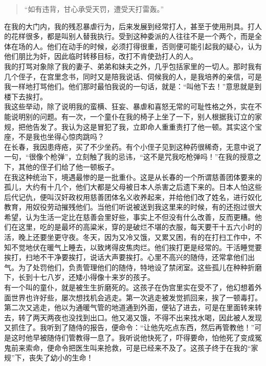\begin{quote}
	“如有违背，甘心承受天罚，遭受天打雷轰。”\\
\end{quote}

在我的大门内，我的残忍暴虐行为，后来发展到经常打人，甚至于使用刑具。打人的花样很多，都是叫别人替我执行。受到这种委派的人往往不是一个两个，而是全体在场的人。他们在动手的时候，必须打得很重，否则便可能引起我的疑心，认为他们朋比为奸，因此临时转移目标，改打不肯使劲打人的人。\\

我的打骂对象除了我的妻子、弟弟和妹夫之外，几乎包括家里的一切人。那时我有几个侄子，在宫里念书，同时又是陪我说话、伺候我的人，是我培养的亲信，可是我一样地打骂他们。他们那时最怕我说的一句话，就是：“叫他下去！”意思就是到楼下去挨打。\\

我这些举动，除了说明我的蛮横、狂妄、暴虐和喜怒无常的可耻性格之外，实在不能说明别的问题。有一次，一个童仆在我的椅子上坐了一下，别人根据我订立的家规，把他告发了。我认为这是冒犯了我，立即命人重重责打了他一顿。其实这个宝座，不是我也坐得心惊肉跳吗？\\

在长春，我因患痔疮，买了不少坐药。有个小侄子见到这种药很稀奇，无意中说了一句，“很像个枪弹”，立刻触了我的忌讳，“这不是咒我吃枪弹吗！”在我的授意之下，其他的侄子们给了他一顿板子。\\

在我这种统治下，境遇最惨的是一批重仆。这是从长春的一个所谓慈善团体要来的孤儿，大约有十几个，他们大都是父母被日本人杀害之后遗下来的。日本人怕这些后代记仇，便叫汉奸政权用慈善团体名义收养起来，并给他们改了姓名，进行奴化教育，用奴役劳动摧残他们。当他们听说被送到我这里来的时候，有的还抱过很大希望，认为生活一定比在慈善会里好些，事实上不但没有什么改善，反而更糟。他们在这里，吃的是最坏的高粱米，穿的是破烂不堪的衣服，每天要干十五六小时的活，晚上还要坐更守夜。冬天，因为又冷又饿，又累又困，有的在打扫工作中，不知不觉地伏在暖气上睡去，以致烤得皮焦肉烂。他们挨打更是经常的。干活睡觉要挨打，扫地不干净要挨打，说话大声要挨打。心里不高兴的随侍，还常拿他们出气。为了处罚他们，负责管理他们的随侍，特地设了禁闭室。这些孤儿在种种折磨下，长到十七八岁，还矮小得像十来岁的孩子。\\

有一个叫的童仆，就是被生生折磨死的。这孩子在伪宫里实在受不了，他幻想着外面世界也许好些，屡次想找机会逃走。第一次逃走被发觉抓回来，挨了一顿毒打。第二次又逃走，他以为通暖气管的地道通到外面，便钻了进去，可是在里面转来转去，转了两天两夜也没找到出口。他又渴又饿，不得不出来找水喝，因此被人发现又抓住了。我听到了随侍的报告，便命令：“让他先吃点东西，然后再管教他！”可是这时他早被随侍们管教得一息了。我听说他快死了，吓得要命，怕他死了变成冤鬼前来索命，便命令把医生叫来抢救，可是已经来不及了。这孩子终于在我的“家规”下，丧失了幼小的生命！\\

